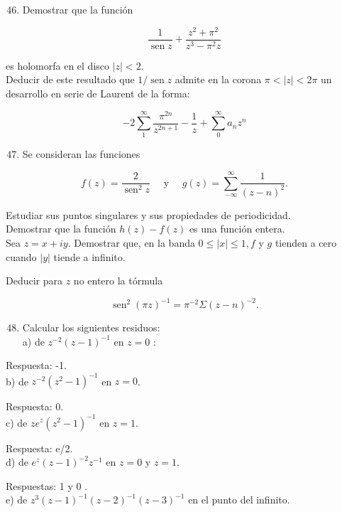\documentclass[10pt]{article}
\theoremstyle{plain}
\theoremstyle{definition}
\theoremstyle{remark}
\begin{document}
\begin{enumerate}
  \setcounter{enumi}{45}
  \item Demostrar que la función
\end{enumerate}

$$
\frac{1}{\operatorname{sen} z}+\frac{z^{2}+\pi^{2}}{z^{3}-\pi^{2} z}
$$

es holomorfa en el disco $|z|<2$.\\
Deducir de este resultado que $1 / \operatorname{sen} z$ admite en la corona $\pi<|z|<2 \pi$ un desarrollo en serie de Laurent de la forma:

$$
-2 \sum_{1}^{\infty} \frac{\pi^{2 n}}{z^{2 n+1}}-\frac{1}{z}+\sum_{0}^{\infty} a_{n} z^{n}
$$

\begin{enumerate}
  \setcounter{enumi}{46}
  \item Se consideran las funciones
\end{enumerate}

$$
f(z)=\frac{2}{\operatorname{sen}^{2} z} \quad \text { y } \quad g(z)=\sum_{-\infty}^{\infty} \frac{1}{(z-n)^{2}} .
$$

Estudiar sus puntos singulares y sus propiedades de periodicidad.\\
Demostrar que la función $h(z)-f(z)$ es una función entera.\\
Sea $z=x+i y$. Demostrar que, en la banda $0 \leqslant|x| \leqslant 1, f$ y $g$ tienden a cero cuando $|y|$ tiende a infinito.

Deducir para $z$ no entero la tórmula

$$
\operatorname{sen}^{2}(\pi z)^{-1}=\pi^{-2} \Sigma(z-n)^{-2} .
$$

\begin{enumerate}
  \setcounter{enumi}{47}
  \item Calcular los siguientes residuos:\\
a) de $z^{-2}(z-1)^{-1}$ en $z=0$ :
\end{enumerate}

Respuesta: -1.\\
b) de $z^{-2}\left(z^{2}-1\right)^{-1}$ en $z=0$.

Respuesta: 0.\\
c) de $z e^{z}\left(z^{2}-1\right)^{-1}$ en $z=1$.

Respuesta: e/2.\\
d) de $e^{z}(z-1)^{-2} z^{-1}$ en $z=0$ y $z=1$.

Respuestas: 1 y 0 .\\
e) de $z^{3}(z-1)^{-1}(z-2)^{-1}(z-3)^{-1}$ en el punto del infinito.
\end{document}
